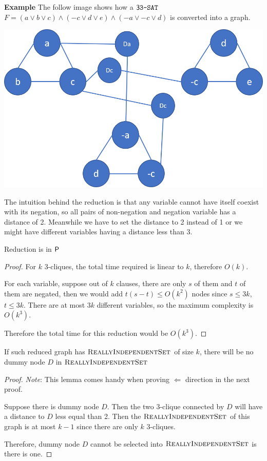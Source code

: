 \textbf{Example} The follow image shows how a $\tSAT$ $F = (a \vee b \vee c) \wedge (-c \vee d \vee e) \wedge (-a\vee -c \vee d)$ is converted into a graph.

\includegraphics[width = \textwidth]{Ex1.png}

The intuition behind the reduction is that any variable cannot have itself coexist with its negation, so all pairs of non-negation and negation variable has a distance of 2. 
Meanwhile we have to set the distance to 2 instead of 1 or we might have different variables having a distance less than 3.

\begin{theorem}
    Reduction is in $\P$
\end{theorem}

\begin{proof}
    For $k$ 3-cliques, the total time required is linear to $k$, therefore $O(k)$.

    For each variable, suppose out of $k$ clauses, there are only $s$ of them and $t$ of them are negated, then we would add $t(s-t) \leq O(k^2)$ nodes since $s \leq 3k$, $t \leq 3k$. 
    There are at most $3k$ different variables, so the maximum complexity is $O(k^3)$.

    Therefore the total time for this reduction would be $O(k^3)$.
\end{proof}

\begin{lemma}
    If such reduced graph has $\RIS$ of size $k$, there will be no dummy node $D$ in $\RIS$
\end{lemma}

\begin{proof}
    \textit{Note}: This lemma comes handy when proving $\Leftarrow$ direction in the next proof. 

    Suppose there is dummy node $D$. 
    Then the two 3-clique connected by $D$ will have a distance to $D$ less equal than 2. 
    Then the $\RIS$ of this graph is at most $k-1$ since there are only $k$ 3-cliques.

    Therefore, dummy node $D$ cannot be selected into $\RIS$ is there is one.
\end{proof}

